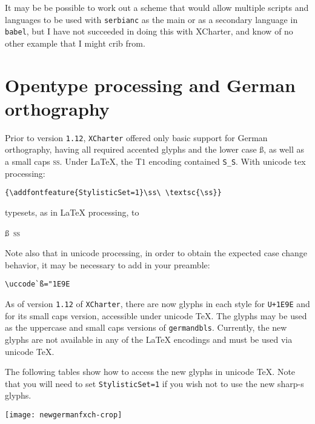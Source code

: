 \documentclass[11pt]{article}
\begin{document}
It may be be possible to work out a scheme that would allow multiple scripts and languages to be used with {\tt serbianc} as the main or as a secondary language in {\tt babel}, but I have not succeeded in doing this with XCharter, and know of no other example that I might crib from.

\section*{Opentype processing and German orthography}
Prior to version {\tt1.12}, {\tt XCharter} offered only basic support for German orthography, having all required accented glyphs and the lower case \ss, as well as a small caps \textsc{\ss}. Under LaTeX, the T$1$ encoding contained \verb|S_S|. With unicode tex processing:
\begin{verbatim}
{\addfontfeature{StylisticSet=1}\ss\ \textsc{\ss}}
\end{verbatim}
typesets, as in LaTeX processing, to

\ss\ \textsc{\ss}

Note also that in unicode processing, in order to obtain the expected case change behavior, it may be necessary to add in your preamble:
\begin{verbatim}
\uccode`ß="1E9E
\end{verbatim}


 As of version {\tt1.12} of {\tt XCharter}, there are now glyphs in each style for {\tt U+1E9E} and for its small caps version,  accessible under unicode TeX. The glyphs may be used as the uppercase and small caps versions of {\tt germandbls}. Currently, the new glyphs are not available in any of the LaTeX encodings and must be used via unicode TeX.

The following tables show how to access the new glyphs in unicode TeX. Note that you will need to set {\tt StylisticSet=1} if you wish not to use the new sharp-s glyphs.

\texttt{[image: newgermanfxch-crop]}
\end{document}
